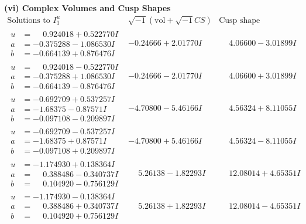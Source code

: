 \documentclass[1p]{elsarticle_modified}
\theoremstyle{definition}
\newcommand{\I}{\sqrt{-1}}
\begin{document}
\newpage\flushleft \textbf{(vi) Complex Volumes and Cusp Shapes}
$$\begin{array}{c|c|c}  
\text{Solutions to }I^u_{1}& \I (\text{vol} + \sqrt{-1}CS) & \text{Cusp shape}\\
 \hline 
\begin{aligned}
u &= \phantom{-}0.924018 + 0.522770 I \\
a &= -0.375288 - 1.086530 I \\
b &= -0.664139 + 0.876476 I\end{aligned}
 & -0.24666 + 2.01770 I & \phantom{-}4.06600 - 3.01899 I \\ \hline\begin{aligned}
u &= \phantom{-}0.924018 - 0.522770 I \\
a &= -0.375288 + 1.086530 I \\
b &= -0.664139 - 0.876476 I\end{aligned}
 & -0.24666 - 2.01770 I & \phantom{-}4.06600 + 3.01899 I \\ \hline\begin{aligned}
u &= -0.692709 + 0.537257 I \\
a &= -1.68375 - 0.87571 I \\
b &= -0.097108 - 0.209897 I\end{aligned}
 & -4.70800 - 5.46166 I & \phantom{-}4.56324 + 8.11055 I \\ \hline\begin{aligned}
u &= -0.692709 - 0.537257 I \\
a &= -1.68375 + 0.87571 I \\
b &= -0.097108 + 0.209897 I\end{aligned}
 & -4.70800 + 5.46166 I & \phantom{-}4.56324 - 8.11055 I \\ \hline\begin{aligned}
u &= -1.174930 + 0.138364 I \\
a &= \phantom{-}0.388486 - 0.340737 I \\
b &= \phantom{-}0.104920 - 0.756129 I\end{aligned}
 & \phantom{-}5.26138 - 1.82293 I & \phantom{-}12.08014 + 4.65351 I \\ \hline\begin{aligned}
u &= -1.174930 - 0.138364 I \\
a &= \phantom{-}0.388486 + 0.340737 I \\
b &= \phantom{-}0.104920 + 0.756129 I\end{aligned}
 & \phantom{-}5.26138 + 1.82293 I & \phantom{-}12.08014 - 4.65351 I \\ \hline\begin{aligned}

\end{aligned}
\end{array}$$
\end{document}

